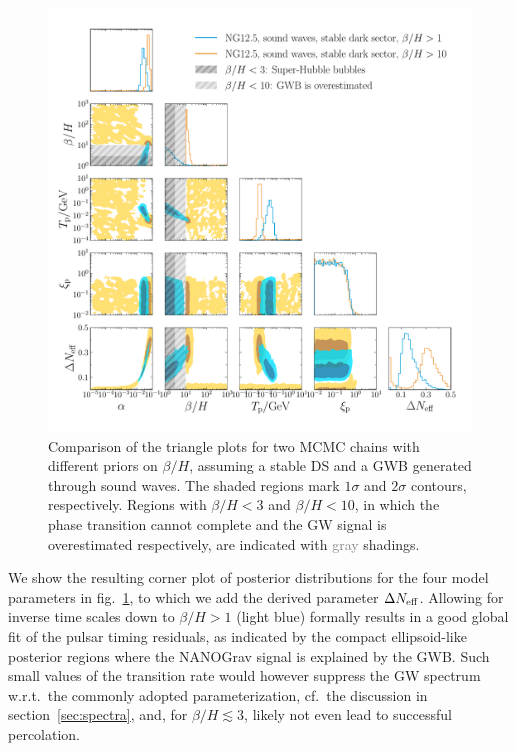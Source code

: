 \begin{figure}[t]
	\centering
	\includegraphics[width = \textwidth]{thesisplots/ptbbn/ptbbn_3}
	\caption{Comparison of the triangle plots for two \ac{MCMC} chains with different priors on $\beta/H$, assuming a stable \ac{DS} and a \ac{GWB} generated through sound waves. The shaded regions mark $1\sigma$ and $2\sigma$ contours, respectively. Regions with $\beta/H<3$ and $\beta/H<10$, in which the phase transition cannot complete and the \ac{GW} signal is overestimated respectively, are indicated with \textcolor{gray}{gray} shadings.} 
	\label{fig:tringle-comparison}
\end{figure}

We show the resulting  corner plot of posterior distributions for the four model parameters in fig.~\ref{fig:tringle-comparison}, to which we  add the derived parameter $\Delta N_\text{eff} $. Allowing for inverse time scales down to $\beta/H > 1$ (\textcolor{DESYcyan}{light blue}) formally results in a good global fit of the pulsar timing residuals, as indicated by the compact  ellipsoid-like posterior regions  where the \ac{NANOGrav} signal is explained by the \ac{GWB}.  Such small values of the transition rate would however suppress the \ac{GW} spectrum w.r.t.~the commonly adopted parameterization, cf.~the discussion in section~\ref{sec:spectra}, and, for $\beta/H \lesssim 3$, likely not even lead to successful percolation.

